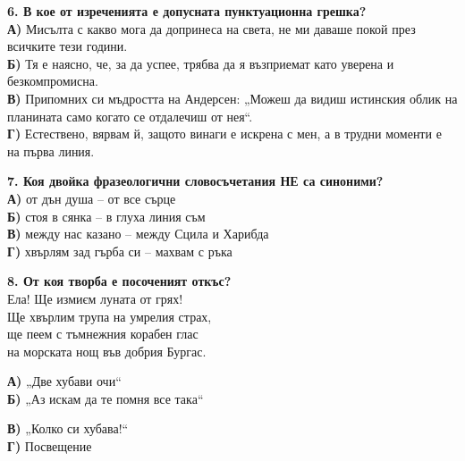 \documentclass[12pt,a4paper]{article}
\begin{document}
\vspace{0.6cm}

\noindent
\textbf{6. В кое от изреченията е допусната пунктуационна грешка?} \\
\textbf{А)} Мисълта с какво мога да допринеса на света, не ми даваше покой през всичките тези години. \\
\textbf{Б)} Тя е наясно, че, за да успее, трябва да я възприемат като уверена и безкомпромисна. \\
\textbf{В)} Припомних си мъдростта на Андерсен: „Можеш да видиш истинския облик на планината само когато се отдалечиш от нея“. \\
\textbf{Г)} Естествено, вярвам й, защото винаги е искрена с мен, а в трудни моменти е на първа линия.

\vspace{0.6cm}

\noindent
\textbf{7. Коя двойка фразеологични словосъчетания \textbf{НЕ} са синоними?} \\
\textbf{А)} от дън душа – от все сърце \\
\textbf{Б)} стоя в сянка – в глуха линия съм \\
\textbf{В)} между нас казано – между Сцила и Харибда \\
\textbf{Г)} хвърлям зад гърба си – махвам с ръка

\vspace{0.6cm}

\noindent
\textbf{8. От коя творба е посоченият откъс?} \\
Ела! Ще измиєм луната от грях! \\
Ще хвърлим трупа на умрелия страх, \\
ще пеем с тъмнежния корабен глас \\
на морската нощ във добрия Бургас. \\

\vspace{-0.1cm}

\noindent
\begin{minipage}[t]{0.48\textwidth}
    \textbf{А)} „Две хубави очи“\\[0.5em]
    \textbf{Б)} „Аз искам да те помня все така“
\end{minipage}%
\begin{minipage}[t]{0.48\textwidth}
    \textbf{В)} „Колко си хубава!“\\[0.5em]
    \textbf{Г)} Посвещение
\end{minipage}

\vspace{0.6cm}
\end{document}
